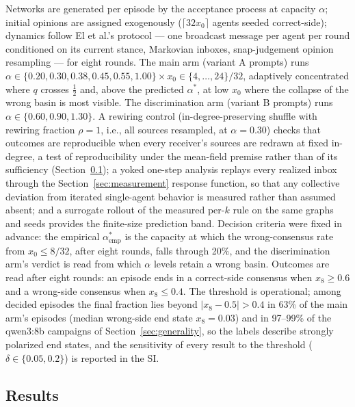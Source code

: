 \documentclass[11pt]{article}
\newcommand{\astar}{\alpha^{*}}
\begin{document}
Networks are generated per episode by the acceptance process at capacity
$\alpha$; initial opinions are assigned exogenously ($\lceil 32 x_0 \rceil$
agents seeded correct-side); dynamics follow El et al.'s protocol --- one
broadcast message per agent per round conditioned on its current stance,
Markovian inboxes, snap-judgement opinion resampling --- for eight rounds. The
main arm (variant A prompts) runs $\alpha \in \{0.20, 0.30, 0.38, 0.45, 0.55,
1.00\} \times x_0 \in \{4,\dots,24\}/32$, adaptively concentrated where $q$
crosses $\tfrac12$ and, above the predicted $\astar$, at low $x_0$ where the
collapse of the wrong basin is most visible. The discrimination arm (variant B
prompts) runs $\alpha \in \{0.60, 0.90, 1.30\}$. A rewiring control
(in-degree-preserving shuffle with rewiring fraction $\rho = 1$, i.e., all sources resampled, at $\alpha = 0.30$) checks
that outcomes are reproducible when every receiver's sources are redrawn at
fixed in-degree, a test of reproducibility under the mean-field premise rather
than of its sufficiency (Section~\ref{sec:results}); a yoked one-step analysis
replays every realized inbox through the Section~\ref{sec:measurement}
response function, so that any collective deviation from iterated single-agent
behavior is measured rather than assumed absent; and a surrogate rollout of
the measured per-$k$ rule on the same graphs and seeds provides the
finite-size prediction band. Decision criteria were fixed in advance: the
empirical $\astar_{\mathrm{emp}}$ is the capacity at which the wrong-consensus
rate from $x_0 \le 8/32$, after eight rounds, falls through 20\%, and the
discrimination arm's verdict is read from which $\alpha$ levels retain a
wrong basin. Outcomes are read after eight rounds: an episode ends in a
correct-side consensus when $x_8 \ge 0.6$ and a wrong-side consensus when
$x_8 \le 0.4$. The threshold is operational; among decided episodes the final
fraction lies beyond $|x_8 - 0.5| > 0.4$ in 63\% of the main arm's episodes
(median wrong-side end state $x_8 = 0.03$) and in 97--99\% of the qwen3:8b
campaigns of Section~\ref{sec:generality}, so the labels describe strongly
polarized end states, and the sensitivity of every result to the threshold
($\delta \in \{0.05, 0.2\}$) is reported in the SI.

\subsection{Results}\label{sec:results}
\end{document}
